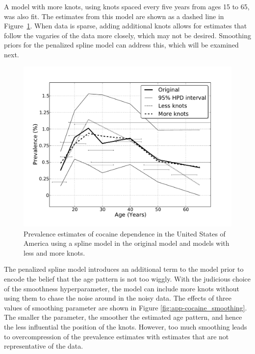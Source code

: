 A model with more knots, using knots spaced every five years from
ages 15 to 65, was also fit.
The estimates from this model are shown as a dashed line in
Figure~\ref{fig:app-cocaine_knots}.  When data is sparse, adding
additional knots allows for estimates that follow the vagaries of the
data more closely, which may not be desired.  Smoothing priors for the
penalized spline model can address this, which will be examined next.

    \begin{figure}[h]
        \begin{center}
            \includegraphics[width=\textwidth]{applications/cocaine_dependence-knots.pdf}
            \caption{Prevalence estimates of cocaine dependence in the United
              States of America using a spline model in the original
              model and models with less and more knots. }
        \label{fig:app-cocaine_knots}
        \end{center}
    \end{figure}

The penalized spline model introduces an additional term to the model
prior to encode the belief that the age pattern is not too wiggly.
With the judicious choice of the smoothness hyperparameter, the model
can include more knots without using them to chase the noise around in
the noisy data.  The effects of three values of smoothing parameter
are shown in Figure \ref{fig:app-cocaine_smoothing}.  The smaller the
parameter, the smoother the estimated age pattern, and hence the less
influential the position of the knots.  However, too much smoothing
leads to overcompression of the prevalence estimates with estimates
that are not representative of the data.

